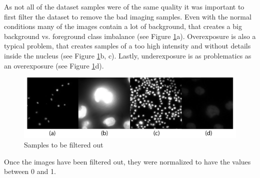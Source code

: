 As not all of the dataset samples were of the same quality it was important to first filter the dataset to remove the bad imaging samples. Even with the normal conditions many of the images contain a lot of background, that creates a big background vs. foreground class imbalance (see Figure \ref{fig:bad-smaples}a). Overexposure is also a typical problem, that creates samples of a too high intensity and without details inside the nucleus (see Figure \ref{fig:bad-smaples}b, c). Lastly, underexposure is as problematics as an overexposure (see Figure \ref{fig:bad-smaples}d).

\begin{figure}[H]
	\begin{center}
		\includegraphics[width=0.6\linewidth]{bilder/nuclei/filter-out.png}
		\caption{Samples to be filtered out}\label{fig:bad-smaples}
	\end{center}
\end{figure}

Once the images have been filtered out, they were normalized to have the values between 0 and 1.